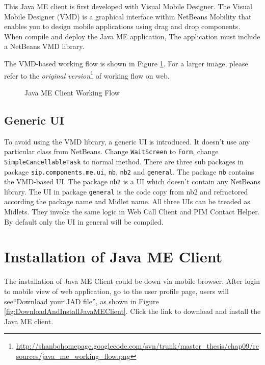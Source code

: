 This Java ME client is first developed with Visual Mobile Designer. The Visual Mobile Designer (VMD) is a graphical interface within NetBeans Mobility that enables you to design mobile applications using drag and drop components. When compile and deploy the Java ME application, The application must include a NetBeans VMD library.

The VMD-based working flow is shown in Figure \ref{fig:JavaMEClientWorkingFlow}. For a larger image, please refer to the \textit{original version}\footnote{\url{http://shanbohomepage.googlecode.com/svn/trunk/master_thesis/chap09/resources/java_me_working_flow.png}} of working flow on web. 

\begin{figure}[!hbtp]
\centering
{}
\caption{Java ME Client Working Flow}
\label{fig:JavaMEClientWorkingFlow}
\end{figure}


\subsection{Generic UI}
\label{sec:JavaMEClient:UserInterface:GenericUI}

To avoid using the VMD library, a generic UI is introduced. It doesn't use any particular class from NetBeans. Change \texttt{WaitScreen} to \texttt{Form}, change \\ \texttt{SimpleCancellableTask} to normal method. There are three sub packages in package \texttt{sip.components.me.ui}, \texttt{nb}, \texttt{nb2} and \texttt{general}. The package \texttt{nb} contains the VMD-based UI. The package \texttt{nb2} is a UI which doesn't contain any NetBeans library. The UI in package \texttt{general} is the code copy from nb2 and refractored according the package name and Midlet name. All three UIs can be treaded as Midlets.  They invoke the same logic in \textsf{Web Call Client} and \textsf{PIM Contact Helper}. By default only the UI in general will be compiled.

\section{Installation of Java ME Client}
\label{sec:JavaMEClient:InstallationOfJavaMEClient}

The installation of Java ME Client could be down via mobile browser. After login to mobile view of web application, go to the user profile page, users will see``Download your JAD file'', as shown in Figure \ref{fig:DownloadAndInstallJavaMEClient}. Click the link to download and install the Java ME client.

